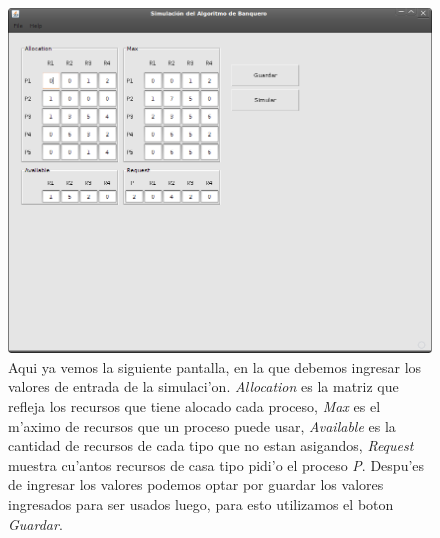 \begin{figure}
\centering
 \includegraphics[scale=0.4,keepaspectratio=true]{./imagenes/banquero/banquero2.png}
 \caption{Aqui ya vemos la siguiente pantalla, en la que debemos ingresar los valores de entrada de la simulaci'on. \emph{Allocation} es la matriz que refleja los recursos que tiene alocado cada proceso, \emph{Max} es el m'aximo de recursos que un proceso puede usar, \emph{Available} es la cantidad de recursos de cada tipo que no estan asigandos, \emph{Request} muestra cu'antos recursos de casa tipo pidi'o el proceso \emph{P}. Despu'es de ingresar los valores podemos optar por guardar los valores ingresados para ser usados luego, para esto utilizamos el boton \emph{Guardar}.}
\end{figure}
